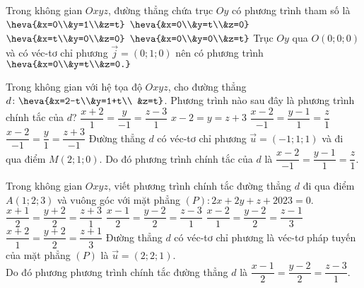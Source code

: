\begin{ex}%
	Trong không gian $O x y z$, đường thẳng chứa trục $O y$ có phương trình tham số là 
	\choice 
	{$\heva{&x=0\\&y=1\\&z=t}$}
		{\True $\heva{&x=0\\&y=t\\&z=0}$}
			{$\heva{&x=t\\&y=0\\&z=0}$}
				{$\heva{&x=0\\&y=0\\&z=t}$}
					\loigiai 
					{
		Trục $O y$ qua $O(0;0;0)$ và có véc-tơ chỉ phương $\vec{j}=(0;1;0)$ nên có phương trình $\heva{&x=0\\&y=t\\&z=0.}$
					}
\end{ex}

\begin{ex}%
	Trong không gian với hệ tọa độ $O x y z$, cho đường thẳng $d\colon\heva{&x=2-t\\&y=1+t\\ &z=t}$. Phương trình nào sau đây là phương trình chính tắc của $d$?
		\choice 
		{$\dfrac{x+2}{1}=\dfrac{y}{-1}=\dfrac{z-3}{1}$}
		{$x-2=y=z+3$}
		{\True $\dfrac{x-2}{-1}=\dfrac{y-1}{1}=\dfrac{z}{1}$}
		{$\dfrac{x-2}{-1}=\dfrac{y}{1}=\dfrac{z+3}{-1}$}
		\loigiai 
		{
Đường thẳng $d$ có véc-tơ chỉ phương $\vec{u}=(-1;1;1)$ và đi qua điểm $M(2;1;0)$. Do đó phương trình chính tắc của $d$ là $\dfrac{x-2}{-1}=\dfrac{y-1}{1}=\dfrac{z}{1}$.		
		}
\end{ex}

\begin{ex}%
	Trong không gian $O x y z$, viết phương trình chính tắc đường thẳng $d$ đi qua điểm $A(1;2;3)$ và vuông góc với mặt phẳng $(P)\colon 2x+2y+z+2023=0$.
	\choice 
	{$\dfrac{x+1}{2}=\dfrac{y+2}{2}=\dfrac{z+3}{1}$}
	{\True $\dfrac{x-1}{2}=\dfrac{y-2}{2}=\dfrac{z-3}{1}$}
	{$\dfrac{x-2}{1}=\dfrac{y-2}{2}=\dfrac{z-1}{3}$}
	{$\dfrac{x+2}{1}=\dfrac{y+2}{2}=\dfrac{z+1}{3}$}
	\loigiai 
	{
Đường thẳng $d$ có véc-tơ chỉ phương là véc-tơ pháp tuyến của mặt phẳng $(P)$ là $\vec{u}=(2;2;1)$.\\
Do đó phương phương trình chính tắc đường thẳng $d$ là $\dfrac{x-1}{2}=\dfrac{y-2}{2}=\dfrac{z-3}{1}$.
	}
\end{ex}

